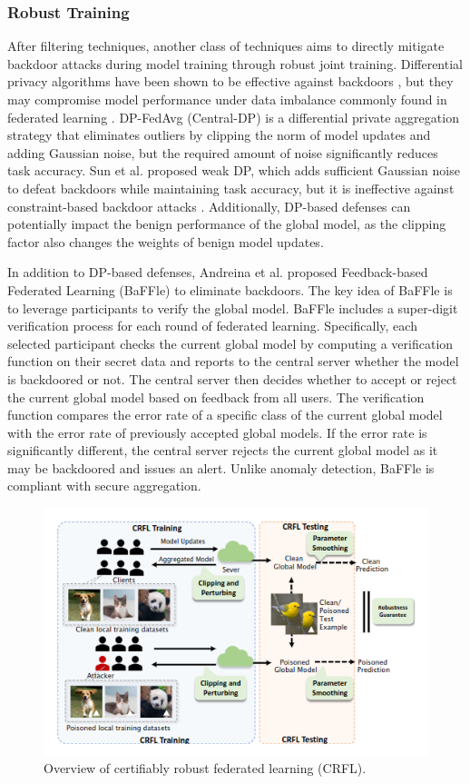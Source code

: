 \documentclass[conference]{IEEEtran}
\begin{document}
\subsubsection{Robust Training}
After filtering techniques, another class of techniques aims to directly mitigate backdoor attacks during model training through robust joint training.
Differential privacy algorithms have been shown to be effective against backdoors \cite{b82}, but they may compromise model performance under data imbalance
commonly found in federated learning \cite{b83}. DP-FedAvg \cite{b84} (Central-DP) is a differential private aggregation strategy that eliminates
outliers by clipping the norm of model updates and adding Gaussian noise, but the required amount of noise significantly reduces
task accuracy. Sun et al. \cite{b27} proposed weak DP, which adds sufficient Gaussian noise to defeat backdoors while maintaining task accuracy,
but it is ineffective against constraint-based backdoor attacks \cite{b25}.
Additionally, DP-based defenses can potentially impact the benign performance of the global model,
as the clipping factor also changes the weights of benign model updates.

In addition to DP-based defenses, Andreina et al. \cite{b85}proposed Feedback-based Federated Learning (BaFFle) to eliminate backdoors.
The key idea of BaFFle is to leverage participants to verify the global model. BaFFle includes a super-digit verification process for each
round of federated learning. Specifically, each selected participant checks the current global model by computing a verification function on
their secret data and reports to the central server whether the model is backdoored or not. The central server then decides whether
to accept or reject the current global model based on feedback from all users. The verification function compares the error rate of
a specific class of the current global model with the error rate of previously accepted global models. If the error rate is significantly different,
the central server rejects the current global model as it may be backdoored and issues an alert. Unlike anomaly detection, BaFFle is compliant with secure aggregation.

\begin{figure}[htbp]
    \centerline{\includegraphics[width=0.8\linewidth,height=0.6\linewidth]{picture/CRFL.png}}
    \caption{Overview of certifiably robust federated learning (CRFL).}
    \label{fig11}
\end{figure}
\end{document}
